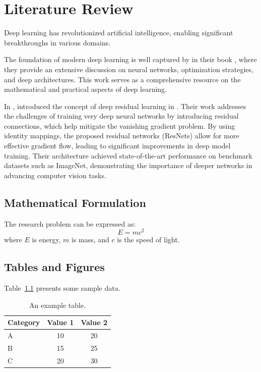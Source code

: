 \chapter{Literature Review }

Deep learning has revolutionized artificial intelligence, enabling significant breakthroughs in various domains. 

The foundation of modern deep learning is well captured by \citeauthor{goodfellow2016deep} in their book \cite{goodfellow2016deep}, where they provide an extensive discussion on neural networks, optimization strategies, and deep architectures. This work serves as a comprehensive resource on the mathematical and practical aspects of deep learning.


In \citeyear{he2016deep}, \citeauthor{he2016deep} introduced the concept of deep residual learning in \cite{he2016deep}. Their work addresses the challenges of training very deep neural networks by introducing residual connections, which help mitigate the vanishing gradient problem. By using identity mappings, the proposed residual networks (ResNets) allow for more effective gradient flow, leading to significant improvements in deep model training. Their architecture achieved state-of-the-art performance on benchmark datasets such as ImageNet, demonstrating the importance of deeper networks in advancing computer vision tasks.

\section{Mathematical Formulation}
The research problem can be expressed as:
\begin{equation}
	E = mc^2
\end{equation}
where $E$ is energy, $m$ is mass, and $c$ is the speed of light.


\section{Tables and Figures}
Table~\ref{tab:example} presents some sample data.

\begin{table}[h]
	\centering
	\begin{tabular}{l c c}
		\toprule
		Category & Value 1 & Value 2 \\
		\midrule
		A & 10 & 20 \\
		B & 15 & 25 \\
		C & 20 & 30 \\
		\bottomrule
	\end{tabular}
	\caption{An example table.}
	\label{tab:example}
\end{table}

